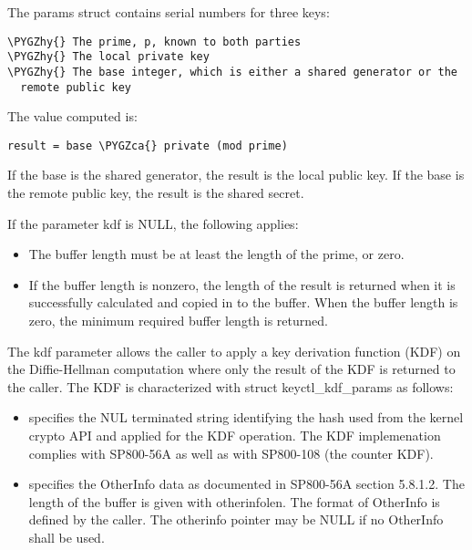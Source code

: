\documentclass[a4paper,8pt,english]{sphinxmanual}
\def\PYGZca{\char`\^}
\def\PYGZhy{\char`\-}
\begin{document}
\begin{itemize}
The params struct contains serial numbers for three keys:

\begin{Verbatim}[commandchars=\\\{\}]
\PYGZhy{} The prime, p, known to both parties
\PYGZhy{} The local private key
\PYGZhy{} The base integer, which is either a shared generator or the
  remote public key
\end{Verbatim}

The value computed is:

\begin{Verbatim}[commandchars=\\\{\}]
result = base \PYGZca{} private (mod prime)
\end{Verbatim}

If the base is the shared generator, the result is the local
public key.  If the base is the remote public key, the result is
the shared secret.

If the parameter kdf is NULL, the following applies:
\begin{itemize}
\item {} 
The buffer length must be at least the length of the prime, or zero.

\item {} 
If the buffer length is nonzero, the length of the result is
returned when it is successfully calculated and copied in to the
buffer. When the buffer length is zero, the minimum required
buffer length is returned.

\end{itemize}

The kdf parameter allows the caller to apply a key derivation function
(KDF) on the Diffie-Hellman computation where only the result
of the KDF is returned to the caller. The KDF is characterized with
struct keyctl\_kdf\_params as follows:
\begin{itemize}
\item {} 
 specifies the NUL terminated string identifying
the hash used from the kernel crypto API and applied for the KDF
operation. The KDF implemenation complies with SP800-56A as well
as with SP800-108 (the counter KDF).

\item {} 
 specifies the OtherInfo data as documented in
SP800-56A section 5.8.1.2. The length of the buffer is given with
otherinfolen. The format of OtherInfo is defined by the caller.
The otherinfo pointer may be NULL if no OtherInfo shall be used.


\end{itemize}
\end{itemize}
\end{document}
